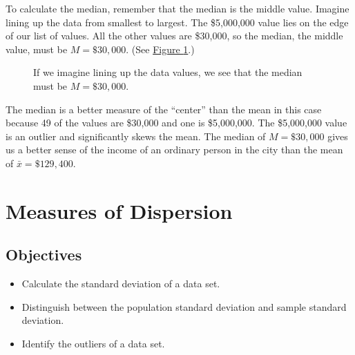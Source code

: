 \documentclass[letterpaper,10pt,english]{jupyterBook}
\begin{document}
\sphinxAtStartPar
To calculate the median, remember that the median is the middle value. Imagine lining up the data from smallest to largest. The \$5,000,000 value lies on the edge of our list of values. All the other values are \$30,000, so the median, the middle value, must be \(M = \$30,000\). (See \hyperref[\detokenize{Ch2 Descriptive Statistics/2.2 Measures of Central Tendency:visual-median}]{Figure \ref{\detokenize{Ch2 Descriptive Statistics/2.2 Measures of Central Tendency:visual-median}}}.)

\begin{figure}[htbp]
\centering
\capstart

\noindent{}
\caption{If we imagine lining up the data values, we see that the median must be \(M = \$30,000\).}\label{\detokenize{Ch2 Descriptive Statistics/2.2 Measures of Central Tendency:visual-median}}\end{figure}

\sphinxAtStartPar
The median is a better measure of the “center” than the mean in this case because 49 of the values are \$30,000 and one is \$5,000,000. The \$5,000,000 value is an outlier and significantly skews the mean. The median of \(M = \$30,000\) gives us a better sense of the income of an ordinary person in the city than the mean of \(\bar{x} = \$129,400\).

\sphinxstepscope


\section{Measures of Dispersion}
\label{\detokenize{Ch2 Descriptive Statistics/2.3 Measures of Dispersion:measures-of-dispersion}}\label{\detokenize{Ch2 Descriptive Statistics/2.3 Measures of Dispersion::doc}}

\subsection{Objectives}
\label{\detokenize{Ch2 Descriptive Statistics/2.3 Measures of Dispersion:objectives}}\begin{itemize}
\item {} 
\sphinxAtStartPar
Calculate the standard deviation of a data set.

\item {} 
\sphinxAtStartPar
Distinguish between the population standard deviation and sample standard deviation.

\item {} 
\sphinxAtStartPar
Identify the outliers of a data set.

\end{itemize}
\end{document}
